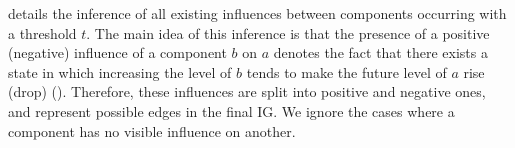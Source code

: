  details the inference of all existing influences between components occurring
with a threshold $t$.
The main idea of this inference is that
the presence of a positive (negative) influence of a component $b$ on $a$ denotes the fact that
there exists a state in which increasing the level of $b$ tends to make the future level of $a$ rise (drop)
().
Therefore, these influences are split into positive and negative ones, and represent possible edges in the final IG.
We ignore the cases where a component has no visible influence on another.
%
